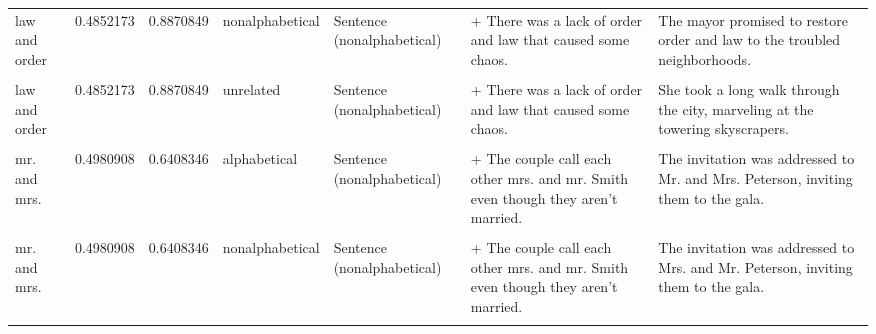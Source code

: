 \documentclass[
  12pt,
]{scrartcl}
\begin{document}
\begin{landscape}
\begin{longtable}{lrrllll}
\addlinespace
law and order & 0.4852173 & 0.8870849 & nonalphabetical & Sentence (nonalphabetical) & + There was a lack of order and law that caused some chaos. & The mayor promised to restore order and law to the troubled neighborhoods.\\
\cellcolor{gray!6}{law and order} & \cellcolor{gray!6}{0.4852173} & \cellcolor{gray!6}{0.8870849} & \cellcolor{gray!6}{unrelated} & \cellcolor{gray!6}{Sentence (alphabetical)} & \cellcolor{gray!6}{+ There was a lack of law and order that caused some chaos.} & \cellcolor{gray!6}{She took a long walk through the city, marveling at the towering skyscrapers.}\\
law and order & 0.4852173 & 0.8870849 & unrelated & Sentence (nonalphabetical) & + There was a lack of order and law that caused some chaos. & She took a long walk through the city, marveling at the towering skyscrapers.\\
\cellcolor{gray!6}{mr. and mrs.} & \cellcolor{gray!6}{0.4980908} & \cellcolor{gray!6}{0.6408346} & \cellcolor{gray!6}{alphabetical} & \cellcolor{gray!6}{Sentence (alphabetical)} & \cellcolor{gray!6}{+ The couple call each other mr. and mrs. Smith even though they aren't married.} & \cellcolor{gray!6}{The invitation was addressed to Mr. and Mrs. Peterson, inviting them to the gala.}\\
mr. and mrs. & 0.4980908 & 0.6408346 & alphabetical & Sentence (nonalphabetical) & + The couple call each other mrs. and mr. Smith even though they aren't married. & The invitation was addressed to Mr. and Mrs. Peterson, inviting them to the gala.\\
\addlinespace
\cellcolor{gray!6}{mr. and mrs.} & \cellcolor{gray!6}{0.4980908} & \cellcolor{gray!6}{0.6408346} & \cellcolor{gray!6}{nonalphabetical} & \cellcolor{gray!6}{Sentence (alphabetical)} & \cellcolor{gray!6}{+ The couple call each other mr. and mrs. Smith even though they aren't married.} & \cellcolor{gray!6}{The invitation was addressed to Mrs. and Mr. Peterson, inviting them to the gala.}\\
mr. and mrs. & 0.4980908 & 0.6408346 & nonalphabetical & Sentence (nonalphabetical) & + The couple call each other mrs. and mr. Smith even though they aren't married. & The invitation was addressed to Mrs. and Mr. Peterson, inviting them to the gala.\\
\cellcolor{gray!6}{mr. and mrs.} & \cellcolor{gray!6}{0.4980908} & \cellcolor{gray!6}{0.6408346} & \cellcolor{gray!6}{unrelated} & \cellcolor{gray!6}{Sentence (alphabetical)} & \cellcolor{gray!6}{+ The couple call each other mr. and mrs. Smith even though they aren't married.} & \cellcolor{gray!6}{They watched the fireworks explode in the night sky, their faces lit up with excitement.}\\

\end{longtable}
\end{landscape}
\end{document}
